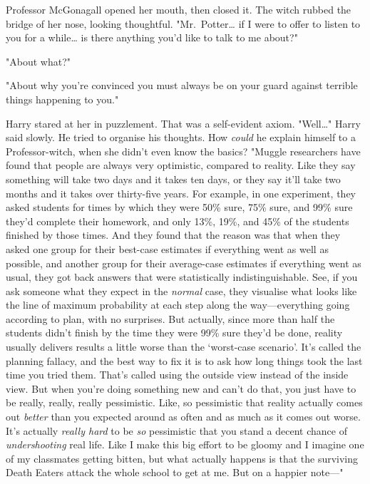 Professor McGonagall opened her mouth, then closed it. The witch rubbed the 
bridge of her nose, looking thoughtful. "Mr.~Potter{\ldots} if I were to offer 
to listen to you for a while{\ldots} is there anything you'd like to talk to me 
about?"

"About what?"

"About why you're convinced you must always be on your guard against terrible 
things happening to you."

Harry stared at her in puzzlement. That was a self-evident axiom. 
"Well{\ldots}" Harry said slowly. He tried to organise his thoughts. How 
\emph{could} he explain himself to a Professor-witch, when she didn't even know 
the basics? "Muggle researchers have found that people are always very 
optimistic, compared to reality. Like they say something will take two days and 
it takes ten days, or they say it'll take two months and it takes over 
thirty-five years. For example, in one experiment, they asked students for 
times by which they were 50\% sure, 75\% sure, and 99\% sure they'd complete their 
homework, and only 13\%, 19\%, and 45\% of the students finished by those times. 
And they found that the reason was that when they asked one group for their 
best-case estimates if everything went as well as possible, and another group 
for their average-case estimates if everything went as usual, they got back 
answers that were statistically indistinguishable. See, if you ask someone what 
they expect in the \emph{normal} case, they visualise what looks like the line 
of maximum probability at each step along the way---everything going according 
to plan, with no surprises. But actually, since more than half the students 
didn't finish by the time they were 99\% sure they'd be done, reality usually 
delivers results a little worse than the `worst-case scenario'. It's called the 
planning fallacy, and the best way to fix it is to ask how long things took the 
last time you tried them. That's called using the outside view instead of the 
inside view. But when you're doing something new and can't do that, you just 
have to be really, really, really pessimistic. Like, so pessimistic that 
reality actually comes out \emph{better} than you expected around as often and 
as much as it comes out worse. It's actually \emph{really hard} to be \emph{so} 
pessimistic that you stand a decent chance of \emph{undershooting} real life. 
Like I make this big effort to be gloomy and I imagine one of my classmates 
getting bitten, but what actually happens is that the surviving Death Eaters 
attack the whole school to get at me. But on a happier note---"


